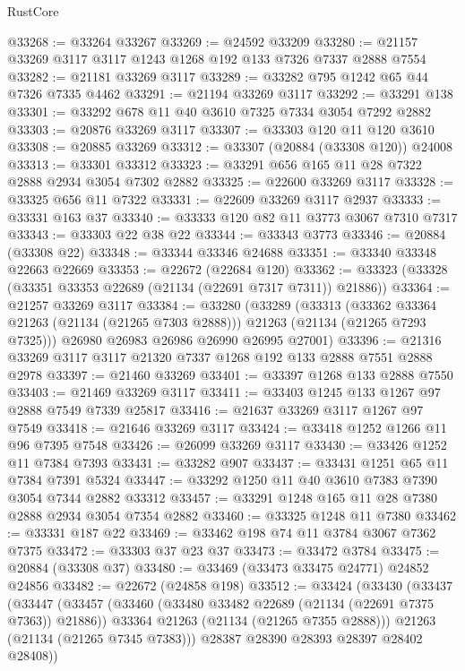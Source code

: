 \begin{lexlean}{RustCore}
\begin{coremodule}
@33268 := @33264 @33267
@33269 := @24592 @33209
@33280 := @21157 @33269 @3117 @3117 @1243 @1268 @192 @133 @7326 @7337 @2888 @7554
@33282 := @21181 @33269 @3117
@33289 := @33282 @795 @1242 @65 @44 @7326 @7335 @4462
@33291 := @21194 @33269 @3117
@33292 := @33291 @138
@33301 := @33292 @678 @11 @40 @3610 @7325 @7334 @3054 @7292 @2882
@33303 := @20876 @33269 @3117
@33307 := @33303 @120 @11 @120 @3610
@33308 := @20885 @33269
@33312 := @33307 (@20884 (@33308 @120)) @24008
@33313 := @33301 @33312
@33323 := @33291 @656 @165 @11 @28 @7322 @2888 @2934 @3054 @7302 @2882
@33325 := @22600 @33269 @3117
@33328 := @33325 @656 @11 @7322
@33331 := @22609 @33269 @3117 @2937
@33333 := @33331 @163 @37
@33340 := @33333 @120 @82 @11 @3773 @3067 @7310 @7317
@33343 := @33303 @22 @38 @22
@33344 := @33343 @3773
@33346 := @20884 (@33308 @22)
@33348 := @33344 @33346 @24688
@33351 := @33340 @33348 @22663 @22669
@33353 := @22672 (@22684 @120)
@33362 := @33323 (@33328 (@33351 @33353 @22689 (@21134 (@22691 @7317 @7311)) @21886))
@33364 := @21257 @33269 @3117
@33384 := @33280
    (@33289
      (@33313
        (@33362 @33364 @21263 (@21134 (@21265 @7303 @2888)))
        @21263
        (@21134 (@21265 @7293 @7325)))
      @26980
      @26983
      @26986
      @26990
      @26995
      @27001)
@33396 := @21316 @33269 @3117 @3117 @21320 @7337 @1268 @192 @133 @2888 @7551 @2888 @2978
@33397 := @21460 @33269
@33401 := @33397 @1268 @133 @2888 @7550
@33403 := @21469 @33269 @3117
@33411 := @33403 @1245 @133 @1267 @97 @2888 @7549 @7339 @25817
@33416 := @21637 @33269 @3117 @1267 @97 @7549
@33418 := @21646 @33269 @3117
@33424 := @33418 @1252 @1266 @11 @96 @7395 @7548
@33426 := @26099 @33269 @3117
@33430 := @33426 @1252 @11 @7384 @7393
@33431 := @33282 @907
@33437 := @33431 @1251 @65 @11 @7384 @7391 @5324
@33447 := @33292 @1250 @11 @40 @3610 @7383 @7390 @3054 @7344 @2882 @33312
@33457 := @33291 @1248 @165 @11 @28 @7380 @2888 @2934 @3054 @7354 @2882
@33460 := @33325 @1248 @11 @7380
@33462 := @33331 @187 @22
@33469 := @33462 @198 @74 @11 @3784 @3067 @7362 @7375
@33472 := @33303 @37 @23 @37
@33473 := @33472 @3784
@33475 := @20884 (@33308 @37)
@33480 := @33469 (@33473 @33475 @24771) @24852 @24856
@33482 := @22672 (@24858 @198)
@33512 := @33424
    (@33430
      (@33437
        (@33447
          (@33457
            (@33460 (@33480 @33482 @22689 (@21134 (@22691 @7375 @7363)) @21886))
            @33364
            @21263
            (@21134 (@21265 @7355 @2888)))
          @21263
          (@21134 (@21265 @7345 @7383)))
        @28387
        @28390
        @28393
        @28397
        @28402
        @28408))

\end{coremodule}
\end{lexlean}
